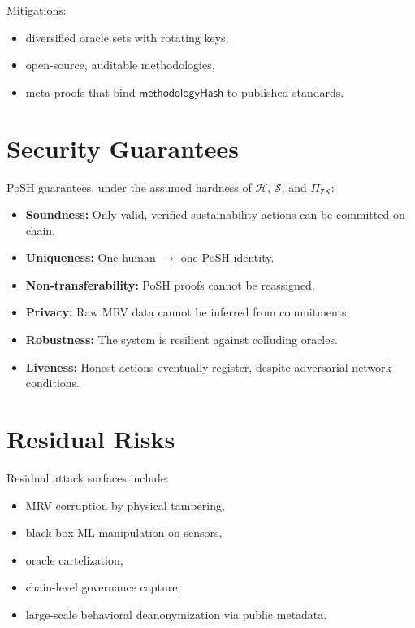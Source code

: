 \documentclass[11pt,a4paper]{report}
\theoremstyle{definition}
\theoremstyle{remark}
\begin{document}
Mitigations:
\begin{itemize}[leftmargin=*]
  \item diversified oracle sets with rotating keys,
  \item open-source, auditable methodologies,
  \item meta-proofs that bind $\mathsf{methodologyHash}$ to published standards.
\end{itemize}

\section{Security Guarantees}

PoSH guarantees, under the assumed hardness of $\mathcal{H}$, $\mathcal{S}$,
and $\Pi_{\textsf{ZK}}$:

\begin{itemize}[leftmargin=*]
  \item \textbf{Soundness:} Only valid, verified sustainability actions can be
        committed on-chain.
  \item \textbf{Uniqueness:} One human $\rightarrow$ one PoSH identity.
  \item \textbf{Non-transferability:} PoSH proofs cannot be reassigned.
  \item \textbf{Privacy:} Raw MRV data cannot be inferred from commitments.
  \item \textbf{Robustness:} The system is resilient against colluding oracles.
  \item \textbf{Liveness:} Honest actions eventually register, despite adversarial
        network conditions.
\end{itemize}

\section{Residual Risks}

Residual attack surfaces include:

\begin{itemize}[leftmargin=*]
  \item MRV corruption by physical tampering,
  \item black-box ML manipulation on sensors,
  \item oracle cartelization,
  \item chain-level governance capture,
  \item large-scale behavioral deanonymization via public metadata.
\end{itemize}
\end{document}
